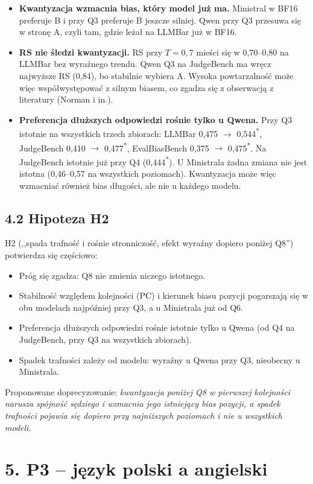 \documentclass[10pt,a4paper]{article}
\newcommand{\s}{\textsuperscript{*}}
\begin{document}
\begin{itemize}
  \item \textbf{Kwantyzacja wzmacnia bias, który model już ma.} Ministral w BF16 preferuje B i przy Q3 preferuje B jeszcze silniej. Qwen przy Q3 przesuwa się w stronę A, czyli tam, gdzie leżał na LLMBar już w BF16.
  \item \textbf{RS nie śledzi kwantyzacji.} RS przy $T=0{,}7$ mieści się w 0,70--0,80 na LLMBar bez wyraźnego trendu. Qwen Q3 na JudgeBench ma wręcz najwyższe RS (0,84), bo stabilnie wybiera A. Wysoka powtarzalność może więc współwystępować z silnym biasem, co zgadza się z obserwacją z literatury (Norman i in.).
  \item \textbf{Preferencja dłuższych odpowiedzi rośnie tylko u Qwena.} Przy Q3 istotnie na wszystkich trzech zbiorach: LLMBar 0,475 $\rightarrow$ 0,544\s, JudgeBench 0,410 $\rightarrow$ 0,477\s, EvalBiasBench 0,375 $\rightarrow$ 0,475\s. Na JudgeBench istotnie już przy Q4 (0,444\s). U Ministrala żadna zmiana nie jest istotna (0,46--0,57 na wszystkich poziomach). Kwantyzacja może więc wzmacniać również bias długości, ale nie u każdego modelu.
\end{itemize}

\subsection*{4.2 Hipoteza H2}
H2 (,,spada trafność i rośnie stronniczość, efekt wyraźny dopiero poniżej Q8'') potwierdza się częściowo:
\begin{itemize}
  \item Próg się zgadza: Q8 nie zmienia niczego istotnego.
  \item Stabilność względem kolejności (PC) i kierunek biasu pozycji pogarszają się w obu modelach najpóźniej przy Q3, a u Ministrala już od Q6.
  \item Preferencja dłuższych odpowiedzi rośnie istotnie tylko u Qwena (od Q4 na JudgeBench, przy Q3 na wszystkich zbiorach).
  \item Spadek trafności zależy od modelu: wyraźny u Qwena przy Q3, nieobecny u Ministrala.
\end{itemize}
Proponowane doprecyzowanie: \emph{kwantyzacja poniżej Q8 w pierwszej kolejności narusza spójność sędziego i wzmacnia jego istniejący bias pozycji, a spadek trafności pojawia się dopiero przy najniższych poziomach i nie u wszystkich modeli}.

\section*{5. P3 -- język polski a angielski}
\end{document}

